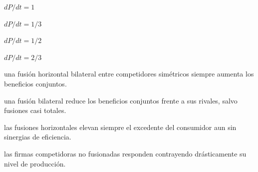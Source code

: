 \begin{opts}
    \item $dP/dt = 1$
    \item $dP/dt = 1/3$
    \item $dP/dt = 1/2$
    \item $dP/dt = 2/3$
\end{opts}

\begin{opts}
    \item una fusión horizontal bilateral entre competidores simétricos siempre aumenta los beneficios conjuntos.
    \item una fusión bilateral reduce los beneficios conjuntos frente a sus rivales, salvo fusiones casi totales.
    \item las fusiones horizontales elevan siempre el excedente del consumidor aun sin sinergias de eficiencia.
    \item las firmas competidoras no fusionadas responden contrayendo drásticamente su nivel de producción.
\end{opts}

